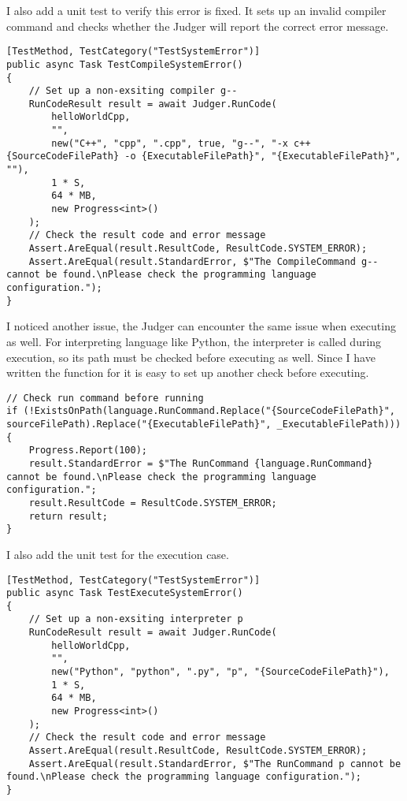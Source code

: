 \documentclass[report.tex]{subfiles}
\begin{document}
I also add a unit test to verify this error is fixed. It sets up an invalid compiler command and checks whether the Judger will report the correct error message.

\begin{verbatim}
[TestMethod, TestCategory("TestSystemError")]
public async Task TestCompileSystemError()
{
    // Set up a non-exsiting compiler g--
    RunCodeResult result = await Judger.RunCode(
        helloWorldCpp,
        "",
        new("C++", "cpp", ".cpp", true, "g--", "-x c++ {SourceCodeFilePath} -o {ExecutableFilePath}", "{ExecutableFilePath}", ""),
        1 * S,
        64 * MB,
        new Progress<int>()
    );
    // Check the result code and error message
    Assert.AreEqual(result.ResultCode, ResultCode.SYSTEM_ERROR);
    Assert.AreEqual(result.StandardError, $"The CompileCommand g-- cannot be found.\nPlease check the programming language configuration.");
}
\end{verbatim}

I noticed another issue, the Judger can encounter the same issue when executing as well. For interpreting language like Python, the interpreter is called during execution, so its path must be checked before executing as well. Since I have written the function for  it is easy to set up another check before executing.

\begin{verbatim}
// Check run command before running
if (!ExistsOnPath(language.RunCommand.Replace("{SourceCodeFilePath}", sourceFilePath).Replace("{ExecutableFilePath}", _ExecutableFilePath)))
{
    Progress.Report(100);
    result.StandardError = $"The RunCommand {language.RunCommand} cannot be found.\nPlease check the programming language configuration.";
    result.ResultCode = ResultCode.SYSTEM_ERROR;
    return result;
}
\end{verbatim}

I also add the unit test for the execution case.

\begin{verbatim}
[TestMethod, TestCategory("TestSystemError")]
public async Task TestExecuteSystemError()
{
    // Set up a non-exsiting interpreter p
    RunCodeResult result = await Judger.RunCode(
        helloWorldCpp,
        "",
        new("Python", "python", ".py", "p", "{SourceCodeFilePath}"),
        1 * S,
        64 * MB,
        new Progress<int>()
    );
    // Check the result code and error message
    Assert.AreEqual(result.ResultCode, ResultCode.SYSTEM_ERROR);
    Assert.AreEqual(result.StandardError, $"The RunCommand p cannot be found.\nPlease check the programming language configuration.");
}
\end{verbatim}
\end{document}
